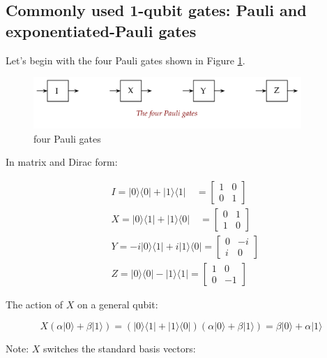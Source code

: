 \documentclass[main.tex]{subfiles}
\begin{document}
\subsection{Commonly used 1-qubit gates: Pauli and exponentiated-Pauli gates}

    Let's begin with the four Pauli gates shown in Figure \ref{fig:05gate1}.
    
    \begin{figure}
        \centering
        \includegraphics[width=4in]{notes/figs/n08/05gate1.png}
        \caption{four Pauli gates}
        \label{fig:05gate1}
    \end{figure}
    
    In matrix and Dirac form:
    
    $$
    \begin{aligned}
    &I=|0\rangle\langle 0|+| 1\rangle\langle 1| \quad=\left[\begin{array}{ll}
    1 & 0 \\
    0 & 1
    \end{array}\right]\\
    &X=|0\rangle\langle 1|+| 1\rangle\langle 0| \quad=\left[\begin{array}{ll}
    0 & 1 \\
    1 & 0
    \end{array}\right]\\
    &Y=-i|0\rangle\langle 1|+i| 1\rangle\langle 0|=\left[\begin{array}{cc}
    0 & -i \\
    i & 0
    \end{array}\right]\\
    &Z=|0\rangle\langle 0|-| 1\rangle\langle 1|=\left[\begin{array}{cc}
    1 & 0 \\
    0 & -1
    \end{array}\right]
    \end{aligned}
    $$
    
    The action of $X$ on a general qubit:
    
    $$
    X(\alpha|0\rangle+\beta|1\rangle)=(|0\rangle\langle 1|+| 1\rangle\langle 0|)(\alpha|0\rangle+\beta|1\rangle)=\beta|0\rangle+\alpha|1\rangle
    $$
    
    Note: $X$ switches the standard basis vectors:
    
\end{document}
